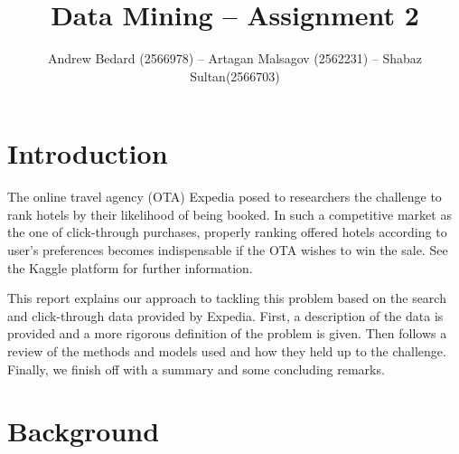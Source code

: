 \documentclass{llncs}
\title{Data Mining -- Assignment 2}
\author{Andrew Bedard (2566978) -- Artagan Malsagov (2562231)  -- Shabaz Sultan(2566703)}
\institute{}
\begin{document}
\maketitle
\section{Introduction}
The online travel agency (OTA) Expedia posed to researchers the challenge to rank hotels by their likelihood of being booked. In such a competitive market as the one of click-through purchases, properly ranking offered hotels according to user's preferences becomes indispensable if the OTA wishes to win the sale. See the Kaggle platform \cite{WinNT} for further information.

This report explains our approach to tackling this problem based on the search and click-through data provided by Expedia. First, a description of the data is provided and a more rigorous definition of the problem is given. Then follows a review of the methods and models used and how they held up to the challenge. Finally, we finish off with a summary and some concluding remarks.  

  
\section{Background}


          


\end{document}
